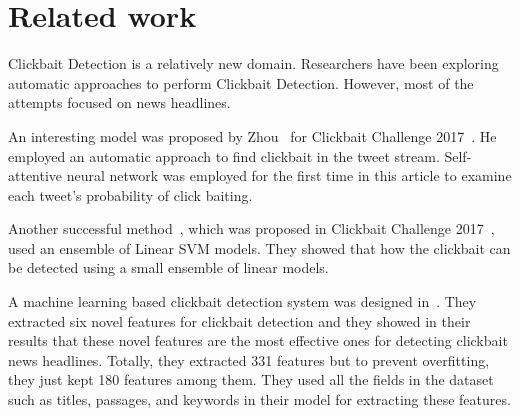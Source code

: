 \section{Related work}
Clickbait Detection is a relatively new domain. Researchers have been exploring automatic approaches to perform Clickbait Detection. However, most of the attempts focused on news headlines.

An interesting model was proposed by Zhou~\cite{Chopra2017} for Clickbait Challenge 2017~\cite{Clickbait2016}. He employed an automatic approach to find clickbait in the tweet stream. Self-attentive neural network was employed for the first time in this article to examine each tweet’s probability of click baiting.

Another successful method~\cite{Joulin2016}, which was proposed in Clickbait Challenge 2017~\cite{Clickbait2016}, used an ensemble of Linear SVM models. They showed that how the clickbait can be detected using a small ensemble of linear models.

A machine learning based clickbait detection system was designed in~\cite{Mikolov2013}. They extracted six novel features for clickbait detection and they showed in their results that these novel features are the most effective ones for detecting clickbait news headlines. Totally, they extracted 331 features but to prevent overfitting, they just kept 180 features among them. They used all the fields in the dataset such as titles, passages, and keywords in their model for extracting
these features.